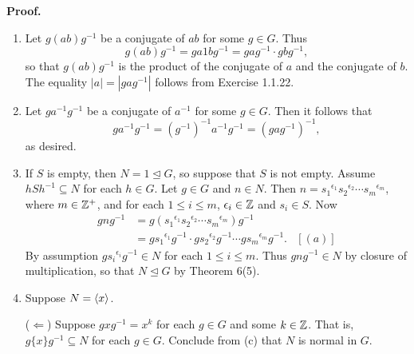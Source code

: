 \begin{enumerate}
      \textbf{Proof.}

      \begin{enumerate}
         \item Let $g(ab)g^{-1}$ be a conjugate of $ab$ for some $g \in G$. Thus
               $$g(ab)g^{-1} = ga1bg^{-1} = gag^{-1} \cdot gbg^{-1},$$
               so that $g(ab)g^{-1}$ is the product of the conjugate of $a$ and
               the conjugate of $b$. The equality $|a| = |gag^{-1}|$ follows
               from Exercise 1.1.22.
         \item Let $ga^{-1}g^{-1}$ be a conjugate of $a^{-1}$ for some
               $g \in G$. Then it follows that
               $$ga^{-1}g^{-1} = (g^{-1})^{-1}a^{-1}g^{-1} = (gag^{-1})^{-1},$$
               as desired.
         \item If $S$ is empty, then $N = 1 \trianglelefteq G$, so suppose that
               $S$ is not empty. Assume $hSh^{-1} \subseteq N$ for each
               $h \in G$. Let $g \in G$ and $n \in N$. Then
               $n = {s_1}^{\epsilon_1}{s_2}^{\epsilon_2} \cdots
                {s_m}^{\epsilon_m}$, where $m \in \mathbb{Z}^+$, and for each
               $1 \le i \le m$, $\epsilon_i \in \mathbb{Z}$ and $s_i \in S$. Now
               \begin{align*}
                  gng^{-1} &= g({s_1}^{\epsilon_1}{s_2}^{\epsilon_2} \cdots
                     {s_m}^{\epsilon_m})g^{-1} \\
                     &= g{s_1}^{\epsilon_1}g^{-1}\cdot g{s_2}^{\epsilon_2}g^{-1} 
                        \cdots g{s_m}^{\epsilon_m}g^{-1}. &[(a)]
               \end{align*}
               By assumption $g{s_i}^{\epsilon_i}g^{-1} \in N$ for each
               $1 \le i \le m$. Thus $gng^{-1} \in N$ by closure of 
               multiplication, so that $N \trianglelefteq G$ by Theorem 6(5).
         \item Suppose $N = \langle x \rangle$.

               ($\Leftarrow$) Suppose $gxg^{-1} = x^k$ for each $g \in G$ and
               some $k \in \mathbb{Z}$. That is, $g\{x\}g^{-1} \subseteq N$ for each
               $g \in G$. Conclude from (c) that $N$ is normal in $G$.


\end{enumerate}
\end{enumerate}
